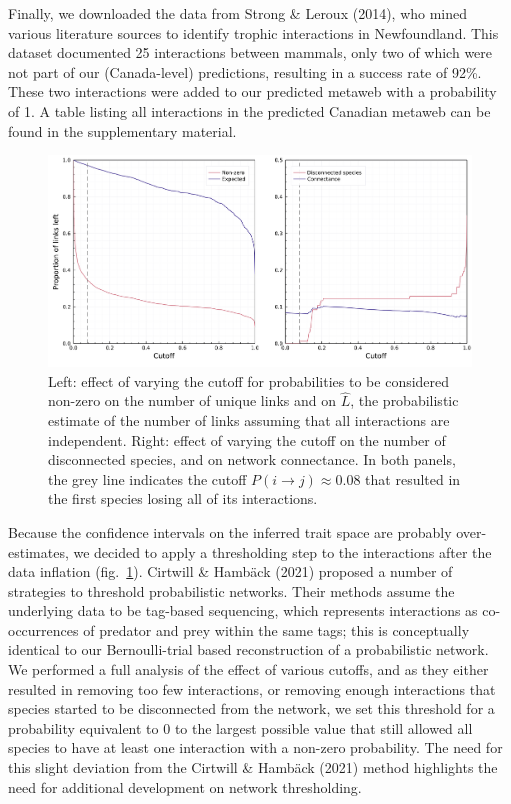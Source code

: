 \documentclass[11pt]{article}
\makeatletter
\def\maxwidth{\ifdim\Gin@nat@width>\linewidth\linewidth
\else\Gin@nat@width\fi}
\let\Oldincludegraphics\includegraphics
\renewcommand{\includegraphics}[1]{\Oldincludegraphics[width=\maxwidth]{#1}}
\makeatother
\begin{document}
Finally, we downloaded the data from Strong \& Leroux (2014), who mined
various literature sources to identify trophic interactions in
Newfoundland. This dataset documented 25 interactions between mammals,
only two of which were not part of our (Canada-level) predictions,
resulting in a success rate of 92\%. These two interactions were added
to our predicted metaweb with a probability of 1. A table listing all
interactions in the predicted Canadian metaweb can be found in the
supplementary material.

\begin{figure}
\hypertarget{fig:thresholds}{%
\centering
\includegraphics{figures/figure-cutoffs.png}
\caption{Left: effect of varying the cutoff for probabilities to be
considered non-zero on the number of unique links and on \(\hat{L}\),
the probabilistic estimate of the number of links assuming that all
interactions are independent. Right: effect of varying the cutoff on the
number of disconnected species, and on network connectance. In both
panels, the grey line indicates the cutoff
\(P(i\rightarrow j) \approx 0.08\) that resulted in the first species
losing all of its interactions.}\label{fig:thresholds}
}
\end{figure}

Because the confidence intervals on the inferred trait space are
probably over-estimates, we decided to apply a thresholding step to the
interactions after the data inflation (fig.~\ref{fig:thresholds}).
Cirtwill \& Hambäck (2021) proposed a number of strategies to threshold
probabilistic networks. Their methods assume the underlying data to be
tag-based sequencing, which represents interactions as co-occurrences of
predator and prey within the same tags; this is conceptually identical
to our Bernoulli-trial based reconstruction of a probabilistic network.
We performed a full analysis of the effect of various cutoffs, and as
they either resulted in removing too few interactions, or removing
enough interactions that species started to be disconnected from the
network, we set this threshold for a probability equivalent to 0 to the
largest possible value that still allowed all species to have at least
one interaction with a non-zero probability. The need for this slight
deviation from the Cirtwill \& Hambäck (2021) method highlights the need
for additional development on network thresholding.
\end{document}
